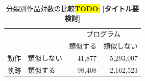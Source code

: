\documentclass[T,J]{fose} %
\newcommand{\todo}[1]{\colorbox{yellow}{{\bf TODO}:}{\color{red} {\textbf{[#1]}}}}
\begin{document}
\begin{table}[t]
    \centering
    \caption{分類別作品対数の比較\todo{タイトル要検討}}
    \begin{tabular}{c|l|r|r}
        \hline
        \multicolumn{2}{c|}{}& \multicolumn{2}{c}{プログラム} \\ \cline{3-4}
        \multicolumn{2}{c|}{}& \multicolumn{1}{c|}{類似する} & \multicolumn{1}{c}{類似しない} \\
        \hline
        動作&類似しない & 41,877 & 5,293,007 \\
        軌跡&類似する & 98,408 & 2,162,523 \\ \cline{2-4}
        \hline
    \end{tabular}
    \label{table:programs-classification}




\end{table}
\end{document}
